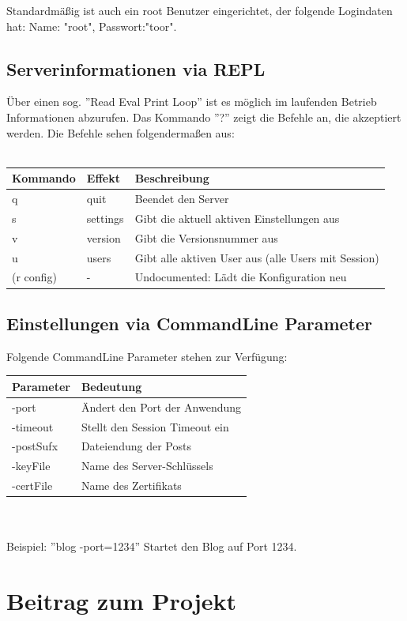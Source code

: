 \documentclass[10pt]{article}
\begin{document}
		Standardm\"a{\ss}ig ist auch ein root Benutzer eingerichtet, der folgende Logindaten hat: Name: "root", Passwort:"toor".
		\subsection{Serverinformationen via REPL}
		\"Uber einen sog. ''Read Eval Print Loop'' ist es m\"oglich im laufenden Betrieb Informationen abzurufen.
		Das Kommando ''?'' zeigt die Befehle an, die akzeptiert werden. Die Befehle sehen folgenderma{\ss}en aus:\\\\
		\begin{tabular}{l|l|l}
			Kommando   & Effekt   & Beschreibung\\
			\hline
			q          & quit     & Beendet den Server\\
			s          & settings & Gibt die aktuell aktiven Einstellungen aus\\
			v          & version  & Gibt die Versionsnummer aus\\
			u          & users    & Gibt alle aktiven User aus (alle Users mit Session)\\
			(r config) & -        & Undocumented: L\"adt die Konfiguration neu
		\end{tabular}
		\subsection{Einstellungen via CommandLine Parameter}
		Folgende CommandLine Parameter stehen zur Verf\"ugung:
		\begin{tabular}{l|l}
			Parameter & Bedeutung\\
			\hline
			-port & \"Andert den Port der Anwendung\\
			-timeout & Stellt den Session Timeout ein\\
			-postSufx & Dateiendung der Posts\\
			-keyFile & Name des Server-Schl\"ussels\\
			-certFile & Name des Zertifikats
		\end{tabular}\\\\
		Beispiel: ''blog -port=1234'' Startet den Blog auf Port 1234.
	\section{Beitrag zum Projekt}
\end{document}
